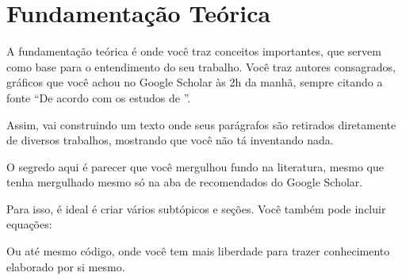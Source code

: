 \chapter{Fundamentação Teórica}
\label{chap:fundamentacao}

A fundamentação teórica é onde você traz conceitos importantes, que servem como base para o entendimento do seu trabalho. Você traz autores consagrados, gráficos que você achou no Google Scholar às 2h da manhã, sempre citando a fonte \enquote{De acordo com os estudos de \cite{Ding2020AdversarialAttacks}}. 

Assim, vai construindo um texto onde seus parágrafos são retirados diretamente de diversos trabalhos, mostrando que você não tá inventando nada.

O segredo aqui é parecer que você mergulhou fundo na literatura, mesmo que tenha mergulhado mesmo só na aba de recomendados do Google Scholar.

Para isso, é ideal é criar vários subtópicos e seções. Você também pode incluir equações:



Ou até mesmo código, onde você tem mais liberdade para trazer conhecimento elaborado por si mesmo.


\hfill
\begin{minipage}[t]{.65\textwidth}
\end{minipage}
